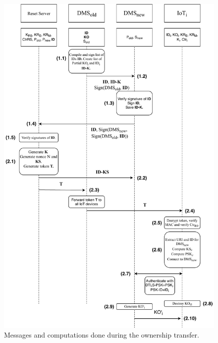 {\begin{figure}[ht]
\centering
\includegraphics[scale=0.545]{papers/ot/images/ot-proto-2.pdf}
\caption{Messages and computations done during the ownership transfer.}
\label{fig:proto-2}
\end{figure}

}
